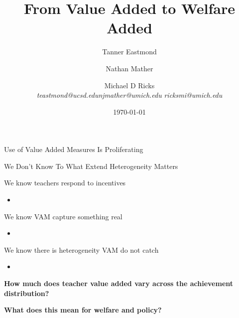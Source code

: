 \documentclass[t,aspectratio=169,11pt]{beamer}
\title{From Value Added to Welfare Added}
\author{Tanner Eastmond \hfill \and Nathan Mather   \and \hfill Michael D Ricks   \\   \textit{teastmond@ucsd.edu}\hfill \textit{njmather{\fontfamily{qag}\selectfont @}umich.edu} \hfill
\textit{ricksmi{\fontfamily{qag}\selectfont @}umich.edu} }
\institute{}
\date{\today}
\newenvironment{wideitemize}{\itemize\addtolength{\itemsep}{14pt}}{\enditemize}
\begin{document}
\begin{frame}
\titlepage 
\end{frame}

\begin{frame}{Use of Value Added Measures Is Proliferating}
\begin{wideitemize}
    \item 
    
    \item 


\end{wideitemize}

\end{frame}

\begin{frame}{We Don't Know To What Extend Heterogeneity Matters}

\begin{wideitemize}
    \item We know teachers respond to incentives
    \begin{itemize}
        \item {}
    \end{itemize}
    \item We know VAM capture something real
    \begin{itemize}
        \item {}
    \end{itemize}
    \item We know there is heterogeneity VAM do not catch
    \begin{itemize}
        \item {}
    \end{itemize}
    
    \vfill
    \item<2-> \textbf<2>{How much does teacher value added vary across the achievement distribution?} %
    \vspace{-14pt}
    \item<3-> \textbf<3>{What does this mean for welfare and policy?}
    \vfill
\end{wideitemize}
\end{frame}
\end{document}
